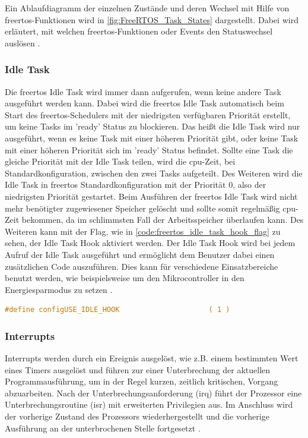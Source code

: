 \documentclass[../EDF Master Thesis.tex]{subfiles}
\begin{document}
Ein Ablaufdiagramm der einzelnen Zustände und deren Wechsel mit Hilfe von \ac{freertos}-Funktionen wird in \autoref{fig:FreeRTOS_Task_States} dargestellt.
Dabei wird erläutert, mit welchen \ac{freertos}-Funktionen oder Events den Statuswechsel auslösen \autocite{freertos-task-states}.

\subsubsection{Idle Task} \label{section:idle_task}
Die \ac{freertos} Idle Task wird immer dann aufgerufen, wenn keine andere Task ausgeführt werden kann.
Dabei wird die \ac{freertos} Idle Task automatisch beim Start des \ac{freertos}-Schedulers mit der niedrigsten verfügbaren Priorität erstellt, um keine Tasks im 'ready' Status zu blockieren.
Das heißt die Idle Task wird nur ausgeführt, wenn es keine Task mit einer höheren Priorität gibt, oder keine Task mit einer höheren Priorität sich im 'ready' Status befindet.
Sollte eine Task die gleiche Priorität mit der Idle Task teilen, wird die \ac{cpu}-Zeit, bei Standardkonfiguration, zwischen den zwei Tasks aufgeteilt.
Des Weiteren wird die Idle Task in \ac{freertos} Standardkonfiguration mit der Priorität 0, also der niedrigsten Priorität gestartet.
Beim Ausführen der \ac{freertos} Idle Task wird nicht mehr benötigter zugewiesener Speicher gelöscht und sollte somit regelmäßig \ac{cpu}-Zeit bekommen, da im schlimmsten Fall der Arbeitsspeicher überlaufen kann.
Des Weiteren kann mit der Flag, wie in \autoref{code:freertos_idle_task_hook_flag} zu sehen, der Idle Task Hook aktiviert werden.
Der Idle Task Hook wird bei jedem Aufruf der Idle Task ausgeführt und ermöglicht dem Benutzer dabei einen zusätzlichen Code auszuführen.
Dies kann für verschiedene Einsatzbereiche benutzt werden, wie beispielsweise um den Mikrocontroller in den Energiesparmodus zu setzen \autocite{freertos_idle_task}.

\begin{lstlisting}[language=C, caption=FreeRTOS Idle Task Hook Flag, label=code:freertos_idle_task_hook_flag]
    #define configUSE_IDLE_HOOK                     ( 1 )
\end{lstlisting}


\subsubsection{Interrupts} \label{section:interrupts}
Interrupts werden durch ein Ereignis ausgelöst, wie z.B. einem bestimmten Wert eines Timers ausgelöst und führen zur einer Unterbrechung der aktuellen Programmausführung, um in der Regel kurzen, zeitlich kritischen, Vorgang abzuarbeiten.
Nach der Unterbrechungsanforderung (\ac{irq}) führt der Prozessor eine Unterbrechungsroutine (\ac{isr}) mit erweiterten Privilegien aus.
Im Anschluss wird der vorherige Zustand des Prozessors wiederhergestellt und die vorherige Ausführung an der unterbrochenen Stelle fortgesetzt \parencite{grundkurs_betriebssysteme, wiki:008}.
\end{document}
